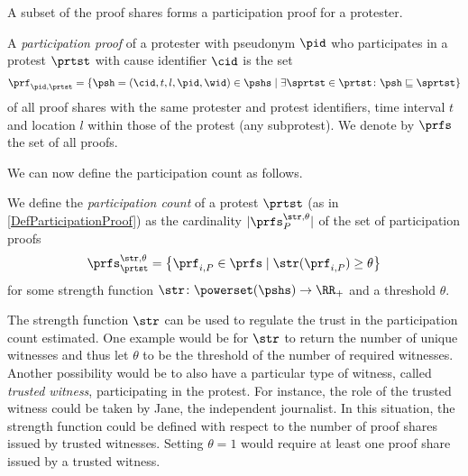 A subset of the proof shares forms a participation proof for a protester.

\begin{definition}%
  \label{DefParticipationProof}\label{DefParticipationProofs}
  A \emph{participation proof} of a protester with pseudonym \(\pid\) who 
  participates in a protest \(\prtst\) with cause identifier \(\cid\) is the 
  set
  \begin{multline}
    \nonumber
    \prf_{\pid, \prtst} =
    \left\{ \psh = (\cid, t, l, \pid, \wid)\in \pshs \mid
      \exists \sprtst\in \prtst\colon \psh\sqsubseteq \sprtst \right\}
  \end{multline}
  of all proof shares with the same protester and protest identifiers, time 
  interval \(t\) and location \(l\) within those of the protest (\ie any 
  subprotest).
  We denote by \(\prfs\) the set of all proofs.
\end{definition}

\NewFunction{\str}{\varsigma}

We can now define the participation count as follows.
\begin{definition}%
  \label{DefParticipationCount}
  We define the \emph{participation count} of a protest \(\prtst\) (as in \cref{DefParticipationProof}) as the cardinality 
  \(|\prfs_{P}^{\str,\theta}|\) of the set of participation proofs \[
    \prfs_{\prtst}^{\str,\theta} = \left\{ \prf_{i,P} \in \prfs \mid
      \str(\prf_{i,P})\geq \theta \right\}
  \] for some strength function \(\str\colon \powerset(\pshs)\to \RR_+\) and a 
  threshold \(\theta\).
\end{definition}

The strength function \(\str\) can be used to regulate the trust in the participation count estimated.
One example would be for \(\str\) to return the number of unique witnesses and thus let \(\theta\) to be the threshold of the number of required witnesses.
Another possibility would be to also have a particular type of witness, called \emph{trusted witness}, participating in the protest. 
For instance, the role of the trusted witness could be taken by Jane, the independent journalist. 
In this situation, the strength function could be defined with respect to the number of proof shares issued by trusted witnesses.
Setting \(\theta = 1\) would require at least one proof share issued by a trusted witness.
